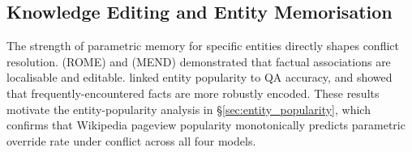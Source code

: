\subsection{Knowledge Editing and Entity Memorisation}

The strength of parametric memory for specific entities directly shapes conflict resolution. \citet{meng2022locating} (ROME) and \citet{mitchell2022fast} (MEND) demonstrated that factual associations are localisable and editable. \citet{mallen2023when} linked entity popularity to QA accuracy, and \citet{zhu2023physics} showed that frequently-encountered facts are more robustly encoded. These results motivate the entity-popularity analysis in \S\ref{sec:entity_popularity}, which confirms that Wikipedia pageview popularity monotonically predicts parametric override rate under conflict across all four models.

